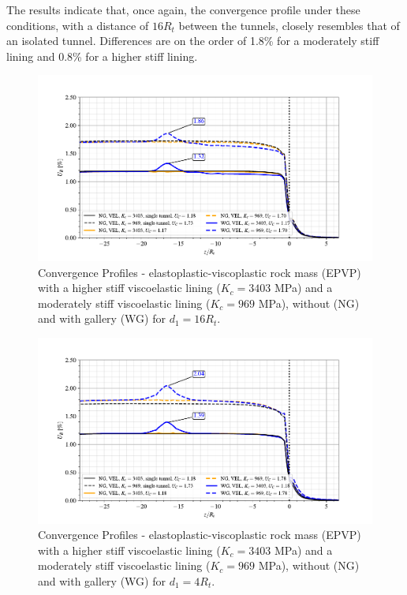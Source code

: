 \documentclass[a4paper,fleqn]{cas-sc}
\begin{document}
The results indicate that, once again, the convergence profile under these conditions, with a distance of $16R_t$ between the tunnels, closely resembles that of an isolated tunnel. Differences are on the order of 1.8\% for a moderately stiff lining and 0.8\% for a higher stiff lining.
\begin{figure}[h!]
	\centering
	\includegraphics[scale=0.9]{Convergence Profiles - EPVP_VEL_d1_16Ri_anotate.pdf}
	\caption{Convergence Profiles - elastoplastic-viscoplastic rock mass (EPVP) with a higher stiff viscoelastic lining ($K_c = 3403$ MPa) and a moderately stiff viscoelastic lining ($K_c = 969$ MPa), without (NG) and with gallery (WG) for $d_1 = 16R_t$.}
	\label{EPVP_VEL_d1_16Ri}
\end{figure}
\FloatBarrier
\begin{figure}[h!]
	\centering
	\includegraphics[scale=0.9]{Convergence Profiles - EPVP_VEL_d1_4Ri_anotate.pdf}
	\caption{Convergence Profiles - elastoplastic-viscoplastic rock mass (EPVP) with a higher stiff viscoelastic lining ($K_c = 3403$ MPa) and a moderately stiff viscoelastic lining ($K_c = 969$ MPa), without (NG) and with gallery (WG) for $d_1 = 4R_t$.}
	\label{EPVP_VEL_d1_4Ri}
\end{figure}
\FloatBarrier
\end{document}
